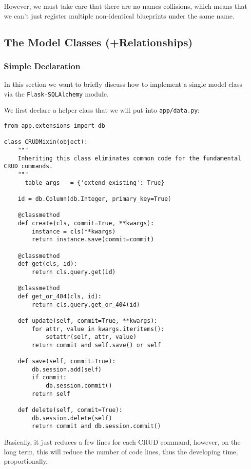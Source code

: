 \documentclass[../main/main.tex]{subfiles}
\begin{document}
However, we must take care that there are no names collisions, which
means that we can't just register multiple non-identical blueprints
under the same name. 

\subsection{The Model Classes (+Relationships)}

\subsubsection{Simple Declaration}
In this section we want to briefly discuss how to implement a single
model class via the \lstinline|Flask-SQLAlchemy| module. 

We first declare a helper class that we will put into
\lstinline|app/data.py|: 

\begin{lstlisting}[caption=app/data.py, label=lst:data.py]
from app.extensions import db

class CRUDMixin(object):
    """
    Inheriting this class eliminates common code for the fundamental CRUD commands.
    """
    __table_args__ = {'extend_existing': True}

    id = db.Column(db.Integer, primary_key=True)

    @classmethod
    def create(cls, commit=True, **kwargs):
        instance = cls(**kwargs)
        return instance.save(commit=commit)

    @classmethod
    def get(cls, id):
        return cls.query.get(id)

    @classmethod
    def get_or_404(cls, id):
        return cls.query.get_or_404(id)

    def update(self, commit=True, **kwargs):
        for attr, value in kwargs.iteritems():
            setattr(self, attr, value)
        return commit and self.save() or self

    def save(self, commit=True):
        db.session.add(self)
        if commit:
            db.session.commit()
        return self

    def delete(self, commit=True):
        db.session.delete(self)
        return commit and db.session.commit()
\end{lstlisting}

Basically, it just reduces a few lines for each CRUD command, however,
on the long term, this will reduce the number of code lines, thus the
developing time, proportionally.
\end{document}

